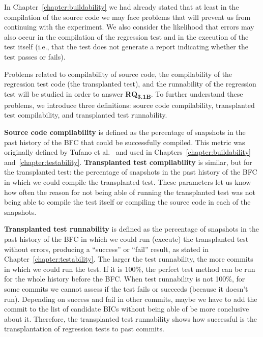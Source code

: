 In Chapter~\ref{chapter:buildability} we had already stated that at least in the compilation of the source code we may face problems that will prevent us from continuing with the experiment. 
We also consider the likelihood that errors may also occur in the compilation of the regression test and in the execution of the test itself (i.e., that the test does not generate a report indicating whether the test passes or fails).

Problems related to compilability of source code, the compilability of the regression test code (the transplanted test), and the runnability of the regression test will be studied in order to answer \textbf{RQ\textsubscript{3.1B}}. 
To further understand these problems, we introduce three definitions: source code compilability, transplanted test compilability, and transplanted test runnability.

\textbf{Source code compilability} is defined as the percentage of snapshots in the past history of the BFC that could be successfully compiled.
This metric was originally defined by Tufano et al.~\cite{tufano2017there} and used in Chapters~\ref{chapter:buildability} and~\ref{chapter:testability}. 
\textbf{Transplanted test compilability} is similar, but for the transplanted test: the percentage of snapshots in the past history of the BFC in which we could compile the transplanted test. 
These parameters let us know how often the reason for not being able of running the transplanted test was not being able to compile the test itself or compiling the source code in each of the snapshots.

\textbf{Transplanted test runnability} is defined as the percentage of snapshots in the past history of the BFC in which we could run (execute) the transplanted test without errors, producing a ``success'' or ``fail'' result, as stated in Chapter~\ref{chapter:testability}. The larger the test runnability, the more commits in which we could run the test. If it is 100\%, the perfect test method can be run for the whole history before the BFC. When test runnability is not 100\%, for some commits we cannot assess if the test fails or succeeds (because it doesn't run). Depending on success and fail in other commits, maybe we have to add the commit to the list of candidate BICs without being able of be more conclusive about it. Therefore, the transplanted test runnability shows how successful is the transplantation of regression tests to past commits.

